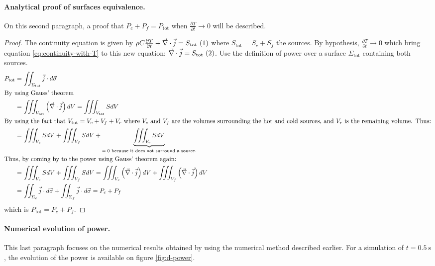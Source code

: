\documentclass[a4paper,12pt,twoside]{article}
\newcommand{\illabel}[1]{ ~ \refstepcounter{equation}(\theequation)\label{#1}} %
\begin{document}
\paragraph{Analytical proof of surfaces equivalence.}
On this second paragraph, a proof that $P_c + P_f = P_\text{tot}$ when $\frac{\partial T}{\partial t}\rightarrow 0$ will be described.

\begin{proof}
  The continuity equation is given by $\rho C\frac{\partial T}{\partial t} + \vec{\nabla}\cdot\vec{j} = S_\text{tot} \illabel{eq:continuity-with-T}$ where $S_\text{tot} = S_c + S_f$ the sources.
  By hypothesis, $\frac{\partial T}{\partial t}\rightarrow 0$ which bring equation \eqref{eq:continuity-with-T} to this new equation: $\vec{\nabla}\cdot\vec{j} = S_\text{tot} \illabel{eq:continuity-without-T}$.
  Use the definition of power over a surface $\Sigma_\text{tot}$ containing both sources.
  \begin{align}
    P_\text{tot} &= \iint_{\Sigma_\text{tot}}\vec{j}\cdot d\vec{\sigma} \\
    \intertext{By using Gauss' theorem}
    &= \iiint_{V_\text{tot}}\left(\vec{\nabla}\cdot\vec{j}\right)dV  = \iiint_{V_\text{tot}}SdV \\
    \intertext{By using the fact that $V_\text{tot} = V_c + V_f + V_r$ where $V_c$ and $V_f$ are the volumes surrounding the hot and cold sources, and $V_r$ is the remaining volume. Thus:}
    &= \iiint_{V_c}SdV + \iiint_{V_f}SdV + \underbrace{\iiint_{V_r}SdV}_\text{$=0$ because it does not surround a source.} \\
    \intertext{Thus, by coming by to the power using Gauss' theorem again:}
    &= \iiint_{V_c}SdV + \iiint_{V_f}SdV = \iiint_{V_c}\left(\vec{\nabla}\cdot\vec{j}\right)dV + \iiint_{V_f}\left(\vec{\nabla}\cdot\vec{j}\right)dV \\
    &= \iint_{\Sigma_c}\vec{j}\cdot d\vec{\sigma} + \iint_{\Sigma_f}\vec{j}\cdot d\vec{\sigma} = P_c + P_f
  \end{align}
  which is $P_\text{tot} = P_c + P_f$.
\end{proof}

\paragraph{Numerical evolution of power.}
This last paragraph focuses on the numerical results obtained by using the numerical method described earlier.
For a simulation of $t=\SI{0.5}{\s}$, the evolution of the power is available on figure \ref{fig:d-power}.
\end{document}
